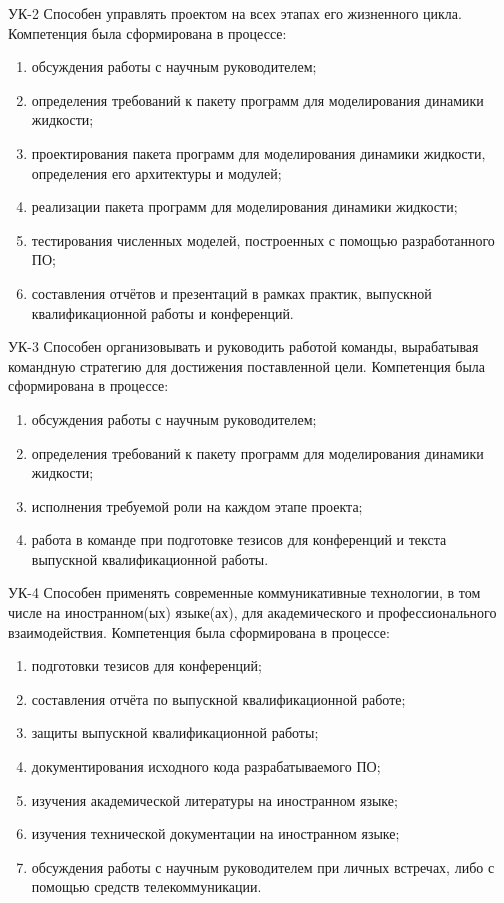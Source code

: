 УК-2 Способен управлять проектом на всех этапах его жизненного цикла.
Компетенция была сформирована в процессе:
\begin{enumerate}
    \item обсуждения работы с научным руководителем;
    \item определения требований к пакету программ для моделирования динамики жидкости;
    \item проектирования пакета программ для моделирования динамики жидкости, определения его архитектуры и модулей;
    \item реализации пакета программ для моделирования динамики жидкости;
    \item тестирования численных моделей, построенных с помощью разработанного ПО;
    \item составления отчётов и презентаций в рамках практик, выпускной квалификационной работы и конференций.
\end{enumerate}

УК-3 Способен организовывать и руководить работой команды, вырабатывая командную стратегию для достижения поставленной цели.
Компетенция была сформирована в процессе:
\begin{enumerate}
    \item обсуждения работы с научным руководителем;
    \item определения требований к пакету программ для моделирования динамики жидкости;
    \item исполнения требуемой роли на каждом этапе проекта;
    \item работа в команде при подготовке тезисов для конференций и текста выпускной квалификационной работы.
\end{enumerate}

УК-4 Способен применять современные коммуникативные технологии, в том числе на иностранном(ых) языке(ах), 
для академического и профессионального взаимодействия.
Компетенция была сформирована в процессе:
\begin{enumerate}
    \item подготовки тезисов для конференций;
    \item составления отчёта по выпускной квалификационной работе;
    \item защиты выпускной квалификационной работы;
    \item документирования исходного кода разрабатываемого ПО;
    \item изучения академической литературы на иностранном языке;
    \item изучения технической документации на иностранном языке;
    \item обсуждения работы с научным руководителем при личных встречах, либо с помощью средств телекоммуникации.
\end{enumerate}

